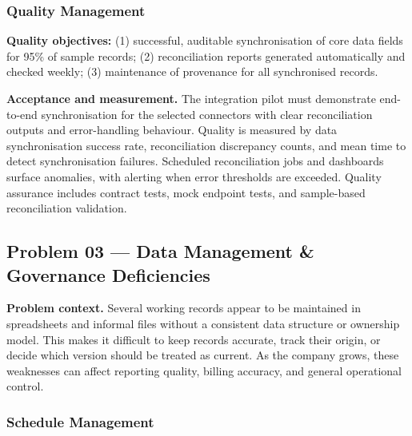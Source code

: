 \documentclass[12pt,a4paper]{report}
\begin{document}
\subsubsection{Quality Management}
\begin{summaryBox}
\textbf{Quality objectives:} (1) successful, auditable synchronisation of core data fields for 95\% of sample records; (2) reconciliation reports generated automatically and checked weekly; (3) maintenance of provenance for all synchronised records.
\end{summaryBox}

\textbf{Acceptance and measurement.} The integration pilot must demonstrate end-to-end synchronisation for the selected connectors with clear reconciliation outputs and error-handling behaviour. Quality is measured by data synchronisation success rate, reconciliation discrepancy counts, and mean time to detect synchronisation failures. Scheduled reconciliation jobs and dashboards surface anomalies, with alerting when error thresholds are exceeded. Quality assurance includes contract tests, mock endpoint tests, and sample-based reconciliation validation.

\subsection{Problem 03 --- Data Management \& Governance Deficiencies}

\textbf{Problem context.} Several working records appear to be maintained in spreadsheets and informal files without a consistent data structure or ownership model. This makes it difficult to keep records accurate, track their origin, or decide which version should be treated as current. As the company grows, these weaknesses can affect reporting quality, billing accuracy, and general operational control.

\subsubsection{Schedule Management}
\end{document}
